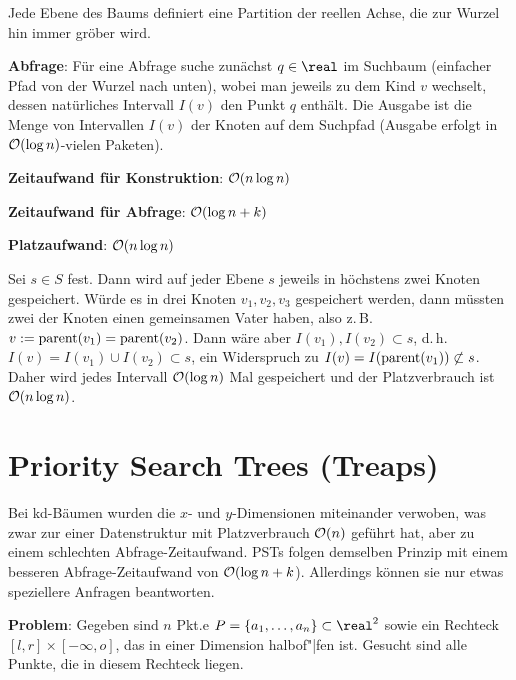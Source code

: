 Jede Ebene des Baums definiert eine Partition der reellen Achse, die zur Wurzel hin immer gröber
wird.

\linie

\textbf{Abfrage}:
Für eine Abfrage suche zunächst $q \in \real$ im Suchbaum
(einfacher Pfad von der Wurzel nach unten),
wobei man jeweils zu dem Kind $v$ wechselt, dessen natürliches Intervall $I(v)$ den Punkt $q$
enthält.
Die Ausgabe ist die Menge von Intervallen $I(v)$ der Knoten auf dem Suchpfad
(Ausgabe erfolgt in $\mathcal{O}(\log n)$-vielen Paketen).

\linie

\textbf{Zeitaufwand für Konstruktion}:
$\mathcal{O}(n \log n)$

\textbf{Zeitaufwand für Abfrage}:
$\mathcal{O}(\log n + k)$

\textbf{Platzaufwand}:
$\mathcal{O}(n \log n)$

\begin{Beweis}
    Sei $s \in S$ fest.
    Dann wird auf jeder Ebene $s$ jeweils in höchstens zwei Knoten gespeichert.
    Würde es in drei Knoten $v_1, v_2, v_3$ gespeichert werden, dann müssten zwei der Knoten
    einen gemeinsamen Vater haben, also z.\,B. $v := \operatorname{parent}(v_1) = \operatorname{parent}(v_2)$.
    Dann wäre aber $I(v_1), I(v_2) \subset s$, d.\,h.
    $I(v) = I(v_1) \cup I(v_2) \subset s$,
    ein Widerspruch zu $I(v) = I(\operatorname{parent}(v_1)) \not\subset s$.
    Daher wird jedes Intervall $\mathcal{O}(\log n)$ Mal gespeichert und der Platzverbrauch ist
    $\mathcal{O}(n \log n)$.
\end{Beweis}

\pagebreak

\section{%
    Priority Search Trees (Treaps)%
}

Bei kd-Bäumen wurden die $x$- und $y$-Dimensionen miteinander verwoben,
was zwar zur einer Datenstruktur mit Platzverbrauch $\mathcal{O}(n)$ geführt hat,
aber zu einem schlechten Abfrage-Zeitaufwand.
PSTs folgen demselben Prinzip mit einem besseren Abfrage-Zeitaufwand von $\mathcal{O}(\log n + k$).
Allerdings können sie nur etwas speziellere Anfragen beantworten.

\textbf{Problem}:
Gegeben sind $n$ Pkt.e $P = \{a_1, \dotsc, a_n\} \subset \real^2$ sowie ein
Rechteck $[l, r] \times [-\infty, o]$, das in einer Dimension halbof"|fen ist.
Gesucht sind alle Punkte, die in diesem Rechteck liegen.


